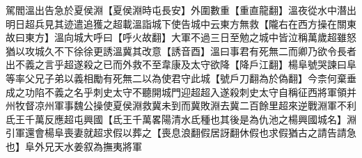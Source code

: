 駕閻溫出告急於夏侯淵【夏侯淵時屯長安】外圍數重【重直龍翻】溫夜從水中潛出明日超兵見其迹遣追獲之超載溫詣城下使告城中云東方無救【隴右在西方操在關東故曰東方】溫向城大呼曰【呼火故翻】大軍不過三日至勉之城中皆泣稱萬歲超雖怒猶以攻城久不下徐徐更誘溫冀其改意【誘音酉】溫曰事君有死無二而卿乃欲令長者出不義之言乎超遂殺之已而外救不至韋康及太守欲降【降戶江翻】楊阜號哭諫曰阜等率父兄子弟以義相勵有死無二以為使君守此城【號戶刀翻為於偽翻】今柰何棄垂成之功陷不義之名乎刺史太守不聽開城門迎超超入遂殺刺史太守自稱征西將軍領并州牧督凉州軍事魏公操使夏侯淵救冀未到而冀敗淵去冀二百餘里超來逆戰淵軍不利氐王千萬反應超屯興國【氐王千萬畧陽清水氐種也其後是為仇池之楊興國城名】淵引軍還會楊阜喪妻就超求假以葬之【喪息浪翻假居訝翻休假也求假猶古之請告請急也】阜外兄天水姜叙為撫夷將軍